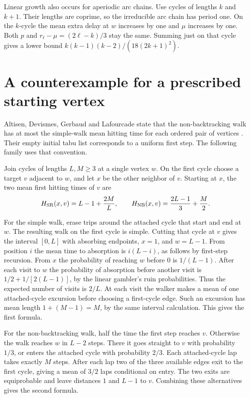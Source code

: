 \documentclass[11pt]{article}
\begin{document}
Linear growth also occurs for aperiodic arc chains. Use cycles of lengths $k$ and $k+1$. Their lengths are coprime, so the irreducible arc chain has period one. On the $k$-cycle the mean extra delay at $w$ increases by one and $\mu$ increases by one. Both $p$ and $r_\ell-\mu=(2\ell-k)/3$ stay the same. Summing just on that cycle gives a lower bound $k(k-1)(k-2)/(18(2k+1)^2)$.

\section{A counterexample for a prescribed starting vertex}

Altisen, Devismes, Gerbaud and Lafourcade state that the non-backtracking
walk has at most the simple-walk mean hitting time for each ordered pair of
vertices \cite[Corollary~5]{tabu}. Their empty initial tabu list corresponds
to a uniform first step. The following family uses that convention.

Join cycles of lengths $L,M\geq3$ at a single vertex $w$. On the first cycle
choose a target $v$ adjacent to $w$, and let $x$ be the other neighbor of $v$.
Starting at $x$, the two mean first hitting times of $v$ are
\[
 H_{\rm SR}(x,v)=L-1+\frac{2M}{L},
 \qquad
 H_{\rm NB}(x,v)=\frac{2L-1}{3}+\frac M2.
\]

For the simple walk, erase trips around the attached cycle that start and
end at $w$. The resulting walk on the first cycle is simple. Cutting that
cycle at $v$ gives the interval $[0,L]$ with absorbing endpoints,
$x=1$, and $w=L-1$. From position $i$ the mean time to absorption is
$i(L-i)$, as follows by first-step recursion. From $x$ the probability
of reaching $w$ before $0$ is $1/(L-1)$. After each visit to $w$ the
probability of absorption before another visit is
$1/2+1/[2(L-1)]$, by the linear gambler's ruin probabilities.
Thus the expected number of visits is $2/L$. At each visit the walker
makes a mean of one attached-cycle excursion before choosing a first-cycle
edge. Such an excursion has mean length $1+(M-1)=M$, by the same interval
calculation. This gives the first formula.

For the non-backtracking walk, half the time the first step reaches $v$.
Otherwise the walk reaches $w$ in $L-2$ steps. There it goes straight to
$v$ with probability $1/3$, or enters the attached cycle with probability
$2/3$. Each attached-cycle lap takes exactly $M$ steps. After each lap
two of the three available edges exit to the first cycle, giving a mean of
$3/2$ laps conditional on entry. The two exits are equiprobable and leave
distances $1$ and $L-1$ to $v$. Combining these alternatives gives the
second formula.
\end{document}
